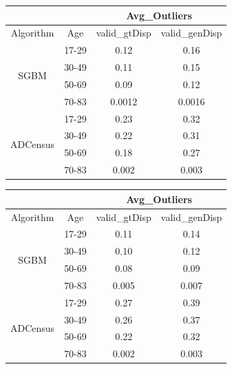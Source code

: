 \begin{minipage}{\linewidth}
\begin{center}
\label{tab:outlmsk}
\begin{tabular}{ |c|c|c|c| }
\hline
\multicolumn{2}{|c}{} & \multicolumn{2}{|c|}{Avg\_Outliers} \\
\hline
Algorithm & Age & valid\_gtDisp & valid\_genDisp \\ \hline
\multirow{4}{*}{SGBM} & 17-29 & 0.12 & 0.16 \\
& 30-49 & 0.11 & 0.15 \\
& 50-69 & 0.09 & 0.12 \\
& 70-83 & 0.0012 & 0.0016 \\ \hline
\multirow{4}{*}{ADCensus} & 17-29 & 0.23 & 0.32 \\
& 30-49 & 0.22 & 0.31 \\
& 50-69 & 0.18 & 0.27 \\
& 70-83 & 0.002 & 0.003 \\ \hline
\end{tabular}
\end{center}
\end{minipage} \newline \newline

\begin{minipage}{\linewidth}
\begin{center}
\label{tab:outlfull}
\begin{tabular}{ |c|c|c|c| }
\hline
\multicolumn{2}{|c}{} & \multicolumn{2}{|c|}{Avg\_Outliers} \\
\hline
Algorithm & Age & valid\_gtDisp & valid\_genDisp \\ \hline
\multirow{4}{*}{SGBM} & 17-29 & 0.11 & 0.14 \\
& 30-49 & 0.10 & 0.12 \\
& 50-69 & 0.08 & 0.09 \\
& 70-83 & 0.005 & 0.007 \\ \hline
\multirow{4}{*}{ADCensus} & 17-29 & 0.27 & 0.39 \\
& 30-49 & 0.26 & 0.37 \\
& 50-69 & 0.22 & 0.32 \\
& 70-83 & 0.002 & 0.003 \\ \hline
\end{tabular}
\end{center}
\end{minipage} \newline

